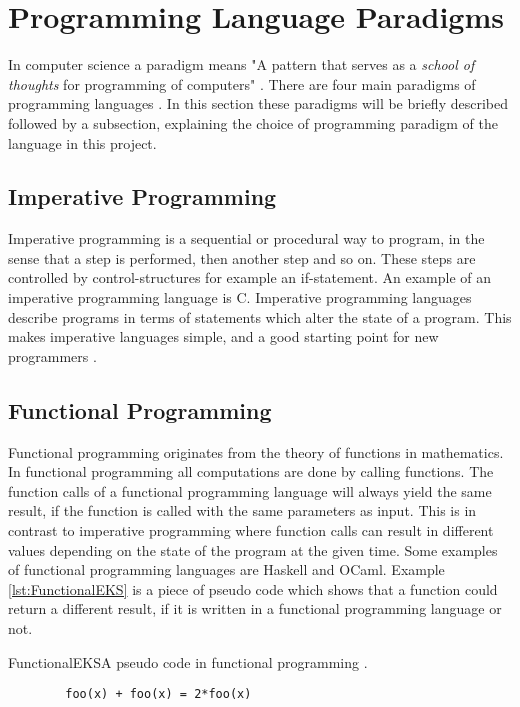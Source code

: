 \section{Programming Language Paradigms}
In computer science a paradigm means "A pattern that serves as a \textit{school of thoughts} for programming of computers" \citep{ProgrammingParadigms2}. 
There are four main paradigms of programming languages \citep{ProgrammingParadigms}. In this section these paradigms will be briefly described followed by a subsection, explaining the choice of programming paradigm of the language in this project.

\subsection{Imperative Programming}
Imperative programming is a sequential or procedural way to program, in the sense that a step is performed, then another step and so on. These steps are controlled by control-structures for example an if-statement. An example of an imperative programming language is C. Imperative programming languages describe programs in terms of statements which alter the state of a program. This makes imperative languages simple, and a good starting point for new programmers \citep{ProgrammingParadigms}.

\subsection{Functional Programming}
Functional programming originates from the theory of functions in mathematics. In functional programming all computations are done by calling functions. The function calls of a functional programming language will always yield the same result, if the function is called with the same parameters as input. This is in contrast to imperative programming where function calls can result in different values depending on the state of the program at the given time. Some examples of functional programming languages are Haskell and OCaml.
Example \ref{lst:FunctionalEKS} is a piece of pseudo code which shows that a function could return a different result, if it is written in a functional programming language or not.

\begin{code}{FunctionalEKS}{A pseudo code in functional programming \citep{funcprog}.}
	\begin{lstlisting}
		foo(x) + foo(x) = 2*foo(x)
	\end{lstlisting}
\end{code}

